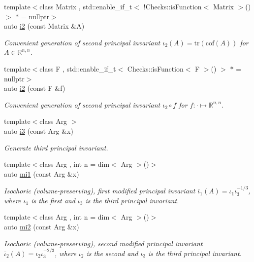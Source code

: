 \begin{DoxyCompactItemize}
{\footnotesize template$<$class Matrix , std\-::enable\-\_\-if\-\_\-t$<$ !\-Checks\-::is\-Function$<$ Matrix $>$() $>$ $\ast$  = nullptr$>$ }\\auto \hyperlink{group__InvariantGroup_ga9e442bab8f203bcd5634a3d0e65bf802}{i2} (const Matrix \&A)
\begin{DoxyCompactList}\small\item\em Convenient generation of second principal invariant $ \iota_2(A)=\mathrm{tr}(\mathrm{cof}(A)) $ for $A\in\mathbb{R}^{n,n}$. \end{DoxyCompactList}\item 
{\footnotesize template$<$class F , std\-::enable\-\_\-if\-\_\-t$<$ Checks\-::is\-Function$<$ F $>$() $>$ $\ast$  = nullptr$>$ }\\auto \hyperlink{group__InvariantGroup_gad3987f97353c8696e602ed1915b3cf47}{i2} (const F \&f)
\begin{DoxyCompactList}\small\item\em Convenient generation of second principal invariant $ \iota_2\circ f $ for $f:\cdot\mapsto\mathbb{R}^{n,n}$. \end{DoxyCompactList}\item 
{\footnotesize template$<$class Arg $>$ }\\auto \hyperlink{group__InvariantGroup_gae1ad80b4b2f34a10564114fad28bc313}{i3} (const Arg \&x)
\begin{DoxyCompactList}\small\item\em Generate third principal invariant. \end{DoxyCompactList}\item 
{\footnotesize template$<$class Arg , int n = dim$<$ Arg $>$()$>$ }\\auto \hyperlink{group__InvariantGroup_ga7eed5e2661171d81e192ac1db791244c}{mi1} (const Arg \&x)
\begin{DoxyCompactList}\small\item\em Isochoric (volume-\/preserving), first modified principal invariant $ \bar\iota_1(A)=\iota_1\iota_3^{-1/3} $, where $\iota_1$ is the first and $\iota_3$ is the third principal invariant. \end{DoxyCompactList}\item 
{\footnotesize template$<$class Arg , int n = dim$<$ Arg $>$()$>$ }\\auto \hyperlink{group__InvariantGroup_ga9d219c5c48cce1d3af60345916963524}{mi2} (const Arg \&x)
\begin{DoxyCompactList}\small\item\em Isochoric (volume-\/preserving), second modified principal invariant $ \bar\iota_2(A)=\iota_2\iota_3^{-2/3} $, where $\iota_2$ is the second and $\iota_3$ is the third principal invariant. \end{DoxyCompactList}\item 

\end{DoxyCompactItemize}
